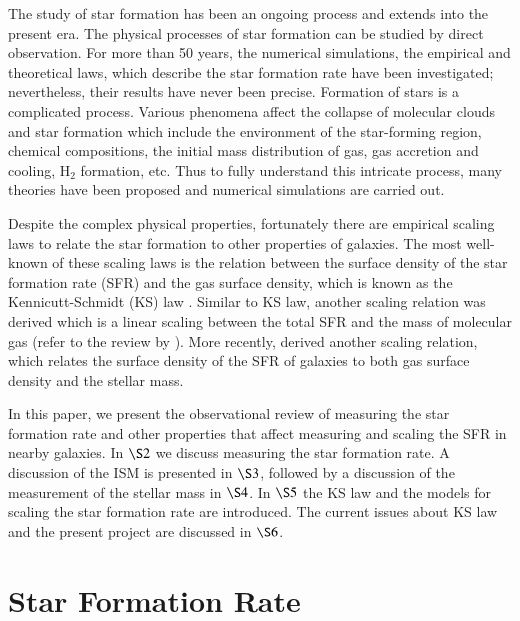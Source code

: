   
The study of star formation has been an ongoing process and extends into the present era. The physical processes of star formation can be studied by direct observation. For more than 50 years, the numerical simulations, the empirical and theoretical laws, which describe the star formation rate have been investigated; nevertheless, their results have never been precise. Formation of stars is a complicated process. Various phenomena affect the collapse of molecular clouds and star formation which include the environment of the star-forming region, chemical compositions, the initial mass distribution of gas, gas accretion and cooling, H$_2$ formation, etc. Thus to fully understand this intricate process, many theories have been proposed and numerical simulations are carried out.

Despite the complex physical properties, fortunately there are empirical scaling laws to relate the star formation to other properties of galaxies. The most well-known of these scaling laws is the relation between the surface density of the star formation rate (SFR) and the gas surface density, which is known as the Kennicutt-Schmidt (KS) law \citep{Schmidt59, Kennicutt98a}. Similar to KS law, another scaling relation was derived which is a linear scaling between the total SFR and the mass of molecular gas (refer to the review by \cite{Elmgrenn11}). More recently, \cite{Shi11} derived another scaling relation, which relates the surface density of the SFR of galaxies to both gas surface density and the stellar mass.  

In this paper, we present the observational review of measuring the star formation rate and other properties that affect measuring and scaling the SFR in nearby galaxies. In $\S2$ we discuss measuring the star formation rate. A discussion of the ISM is presented in $\S3$, followed by a discussion of the measurement of the stellar mass in $\S4$. In $\S5$ the KS law and the models for scaling the star formation rate are introduced. The current issues about KS law and the present project are discussed in $\S6$. 

\section{Star Formation Rate}
\label{chap:sfr}

